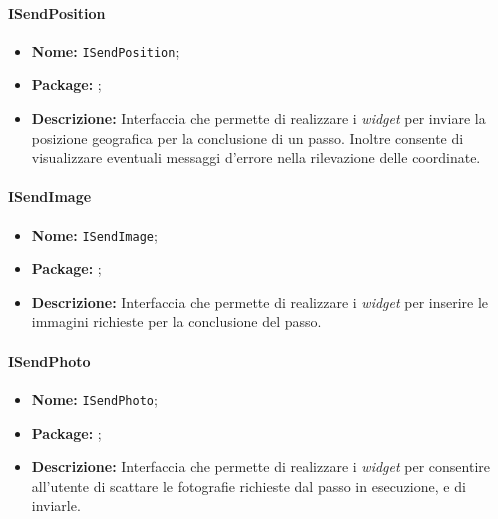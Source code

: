 \paragraph{ISendPosition}
\begin{itemize}
\item \textbf{Nome:} \texttt{ISendPosition};
\item \textbf{Package:} \texttt{\iViewUser{}};
\item \textbf{Descrizione:} Interfaccia che permette  di realizzare i \textit{widget} per inviare la posizione geografica per la conclusione di un passo. Inoltre consente di visualizzare eventuali messaggi d'errore nella rilevazione delle coordinate.
\end{itemize}

\paragraph{ISendImage}
\begin{itemize}
\item \textbf{Nome:} \texttt{ISendImage};
\item \textbf{Package:} \texttt{\iViewUser{}};
\item \textbf{Descrizione:} Interfaccia che permette di realizzare i \textit{widget} per inserire le immagini richieste per la conclusione del passo.
\end{itemize}

\paragraph{ISendPhoto}
\begin{itemize}
\item \textbf{Nome:} \texttt{ISendPhoto};
\item \textbf{Package:} \texttt{\iViewUser{}};
\item \textbf{Descrizione:} Interfaccia che permette di realizzare i \textit{widget} per consentire all'utente di scattare le fotografie richieste dal passo in esecuzione, e di inviarle.
\end{itemize}

